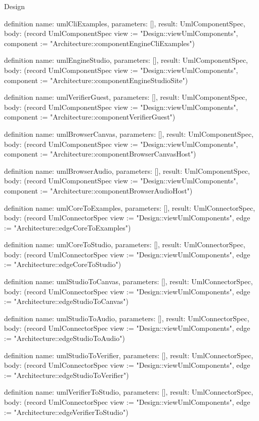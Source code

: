 \begin{lexlean}{Design}
\begin{semanticmodule}
definition{
  name: umlCliExamples,
  parameters: [],
  result: UmlComponentSpec,
  body: (record UmlComponentSpec {view := "Design::viewUmlComponents", component := "Architecture::componentEngineCliExamples"})
}

definition{
  name: umlEngineStudio,
  parameters: [],
  result: UmlComponentSpec,
  body: (record UmlComponentSpec {view := "Design::viewUmlComponents", component := "Architecture::componentEngineStudioSite"})
}

definition{
  name: umlVerifierGuest,
  parameters: [],
  result: UmlComponentSpec,
  body: (record UmlComponentSpec {view := "Design::viewUmlComponents", component := "Architecture::componentVerifierGuest"})
}

definition{
  name: umlBrowserCanvas,
  parameters: [],
  result: UmlComponentSpec,
  body: (record UmlComponentSpec {view := "Design::viewUmlComponents", component := "Architecture::componentBrowserCanvasHost"})
}

definition{
  name: umlBrowserAudio,
  parameters: [],
  result: UmlComponentSpec,
  body: (record UmlComponentSpec {view := "Design::viewUmlComponents", component := "Architecture::componentBrowserAudioHost"})
}

definition{
  name: umlCoreToExamples,
  parameters: [],
  result: UmlConnectorSpec,
  body: (record UmlConnectorSpec {view := "Design::viewUmlComponents", edge := "Architecture::edgeCoreToExamples"})
}

definition{
  name: umlCoreToStudio,
  parameters: [],
  result: UmlConnectorSpec,
  body: (record UmlConnectorSpec {view := "Design::viewUmlComponents", edge := "Architecture::edgeCoreToStudio"})
}

definition{
  name: umlStudioToCanvas,
  parameters: [],
  result: UmlConnectorSpec,
  body: (record UmlConnectorSpec {view := "Design::viewUmlComponents", edge := "Architecture::edgeStudioToCanvas"})
}

definition{
  name: umlStudioToAudio,
  parameters: [],
  result: UmlConnectorSpec,
  body: (record UmlConnectorSpec {view := "Design::viewUmlComponents", edge := "Architecture::edgeStudioToAudio"})
}

definition{
  name: umlStudioToVerifier,
  parameters: [],
  result: UmlConnectorSpec,
  body: (record UmlConnectorSpec {view := "Design::viewUmlComponents", edge := "Architecture::edgeStudioToVerifier"})
}

definition{
  name: umlVerifierToStudio,
  parameters: [],
  result: UmlConnectorSpec,
  body: (record UmlConnectorSpec {view := "Design::viewUmlComponents", edge := "Architecture::edgeVerifierToStudio"})
}


\end{semanticmodule}
\end{lexlean}
